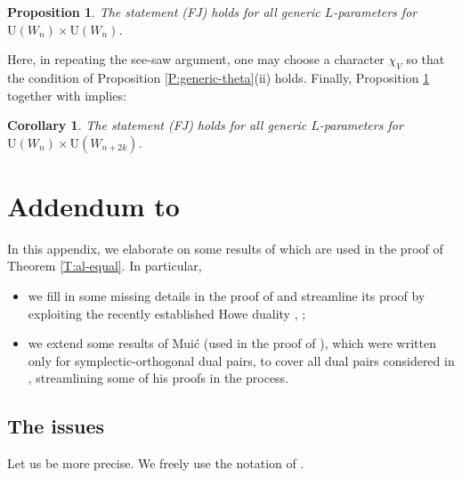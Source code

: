 \documentclass[11pt]{amsart}
\numberwithin{equation}{section}
\theoremstyle{plain}
\newtheorem{prop}[thm]{Proposition}
\newtheorem{cor}[thm]{Corollary}
\theoremstyle{definition}
\theoremstyle{remark}
\def\U{\mathrm{U}}
\begin{document}
\begin{prop}
\label{P:FJ-generic}
The statement (FJ) holds for all generic $L$-parameters for $\U(W_n) \times \U(W_n)$.
\end{prop}

Here, in repeating the see-saw argument, one may choose a character $\chi_V$ so that the condition of Proposition \ref{P:generic-theta}(ii) holds.
Finally, Proposition \ref{P:FJ-generic} together with \cite[Theorem 19.1]{ggp1} implies:

\begin{cor}
The statement (FJ) holds for all generic $L$-parameters for $\U(W_n) \times \U(W_{n+2k})$.
\end{cor}

\appendix

\section{\textbf{Addendum to \cite{gi}}}

In this appendix, we elaborate on some results of \cite[Appendix C]{gi} which are used in the proof of Theorem \ref{T:al-equal}.
In particular,
\begin{itemize}
\item we fill in some missing details in the proof of \cite[Proposition C.1(ii)]{gi} and streamline its proof by exploiting the recently established Howe duality \cite{gt1}, \cite{gt2};
\item we extend some results of Mui\'c \cite[Lemma 4.2 and Theorem 5.1(i)]{muic} (used in the proof of \cite[Proposition C.1(ii)]{gi}), which were written only for symplectic-orthogonal dual pairs, to cover all dual pairs considered in \cite{gi}, streamlining some of his proofs in the process.
\end{itemize}

\subsection{The issues}

Let us be more precise.
We freely use the notation of \cite[\S C.1]{gi}.
\end{document}
